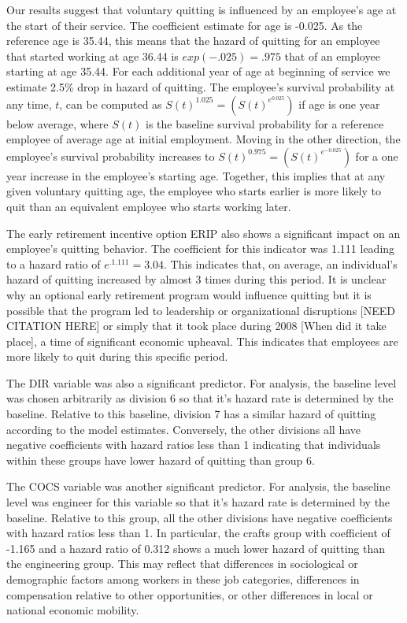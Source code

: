 \documentclass[12pt,letterpaper]{article}
\begin{document}
Our results suggest that voluntary quitting is influenced by an employee's age at the start of their service. The coefficient estimate for age is -0.025. As the reference age is 35.44, this means that the hazard of quitting for an employee that started working at age 36.44 is $exp(-.025)=.975$ that of an employee starting at age 35.44. For each additional year of age at beginning of service we estimate 2.5\% drop in hazard of quitting. The employee's survival probability at any time, $t$, can be computed as $S(t)^{1.025} = (S(t)^{e^{0.025}})$ if age is one year below average, where $S(t)$ is the baseline survival probability for a reference employee of average age at initial employment. Moving in the other direction, the employee's survival probability increases to $S(t)^{0.975}=(S(t)^{e^{-0.025}})$ for a one year increase in the employee's starting age. Together, this implies that at any given voluntary quitting age, the employee who starts earlier is more likely to quit than an equivalent employee who starts working later.

The early retirement incentive option ERIP also shows a significant impact on an employee's quitting behavior.  The coefficient for this indicator was 1.111 leading to a hazard ratio of $e^{.1.111} = 3.04$.  This indicates that, on average, an individual's hazard of quitting increased by almost 3 times during this period.  It is unclear why an optional early retirement program would influence quitting but it is possible that the program led to leadership or organizational disruptions [NEED CITATION HERE] or simply that it took place during  2008 [When did it take place], a time of significant economic upheaval. This indicates that employees are more likely to quit during this specific period.

The DIR variable was also a significant predictor.  For analysis, the baseline level was chosen arbitrarily as division 6 so that it's hazard rate is determined by the baseline.  Relative to this baseline, division 7 has a similar hazard of quitting according to the model estimates. Conversely, the other divisions all have negative coefficients with hazard ratios less than 1 indicating that individuals within these groups have lower hazard of quitting than group 6.

The COCS variable was another significant predictor. For analysis, the baseline level was engineer for this variable so that it's hazard rate is determined by the baseline. Relative to this group, all the other divisions have negative coefficients with hazard ratios less than 1. In particular, the crafts group with coefficient of -1.165 and a hazard ratio of 0.312 shows a much lower hazard of quitting than the engineering group.  This may reflect that differences in sociological or demographic factors among workers in these job categories, differences in compensation relative to other opportunities, or other differences in local or national economic mobility.
\end{document}
